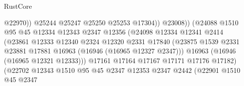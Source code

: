 \begin{lexlean}{RustCore}
\begin{coremodule}
                                                @22970))
                                            @25244
                                            @25247
                                            @25250
                                            @25253
                                            @17304))
                                        @23008))
                                    (@24088
                                      @1510
                                      @95
                                      @45
                                      @12334
                                      @12343
                                      @2347
                                      @12356
                                      (@24098
                                        @12334
                                        @12341
                                        @2414
                                        (@23861
                                          @12333
                                          @12340
                                          @2324
                                          @12320
                                          @2331
                                          @17840
                                          (@23875
                                            @1539
                                            @2331
                                            @23881
                                            @17881
                                            @16963
                                            (@16946 (@16965 @12327 @2347)))
                                          @16963
                                          (@16946 (@16965 @12321 @12333)))
                                        @17161
                                        @17164
                                        @17167
                                        @17171
                                        @17176
                                        @17182)
                                      (@22702
                                        @12343
                                        @1510
                                        @95
                                        @45
                                        @2347
                                        @12353
                                        @2347
                                        @2442
                                        (@22901
                                          @1510
                                          @45
                                          @2347

\end{coremodule}
\end{lexlean}
